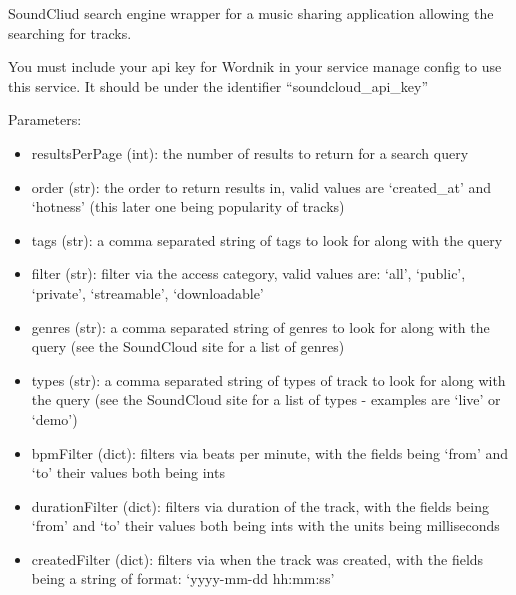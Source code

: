 \documentclass[letterpaper,10pt,english]{sphinxmanual}
\begin{document}
\begin{fulllineitems}
\label{api2.0:puppy.search.engine.SoundCloud}
SoundCliud search engine wrapper for a music sharing application allowing the searching for tracks.

You must include your api key for Wordnik in your service manage config to use this service. It should be under the identifier ``soundcloud\_api\_key''

Parameters:
\begin{itemize}
\item {} 
resultsPerPage (int): the number of results to return for a search query

\item {} 
order (str): the order to return results in, valid values are `created\_at' and `hotness' (this later one being popularity of tracks)

\item {} 
tags (str): a comma separated string of tags to look for along with the query

\item {} 
filter (str): filter via the access category, valid values are: `all', `public', `private', `streamable', `downloadable'

\item {} 
genres (str):  a comma separated string of genres to look for along with the query (see the SoundCloud site for a list of genres)

\item {} 
types (str): a comma separated string of types of track to look for along with the query (see the SoundCloud site for a list of types - examples are `live' or `demo')

\item {} 
bpmFilter (dict): filters via beats per minute, with the fields being `from' and `to' their values both being ints

\item {} 
durationFilter (dict): filters via duration of the track, with the fields being `from' and `to' their values both being ints with the units being milliseconds

\item {} 
createdFilter (dict): filters via when the track was created, with the fields being a string of format: `yyyy-mm-dd hh:mm:ss'

\end{itemize}

\end{fulllineitems}
\end{document}
